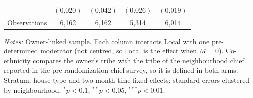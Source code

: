 \begin{table}[!htbp]
\begin{threeparttable}
\begin{tabular}{lcccc}
 & $(0.020)$ & $(0.042)$ & $(0.026)$ & $(0.019)$ \\
Observations & 6,162 & 6,162 & 5,314 & 6,014 \\
\bottomrule
\end{tabular}
\begin{tablenotes}[flushleft]\scriptsize
\item \textit{Notes:} Owner-linked sample. Each column interacts Local with one pre-determined moderator (not centred, so Local is the effect when $M=0$). Co-ethnicity compares the owner's tribe with the tribe of the neighbourhood chief reported in the pre-randomization chief survey, so it is defined in both arms. Stratum, house-type and two-month time fixed effects; standard errors clustered by neighbourhood. $^{*}p<0.1$, $^{**}p<0.05$, $^{***}p<0.01$.
\end{tablenotes}
\end{threeparttable}
\end{table}